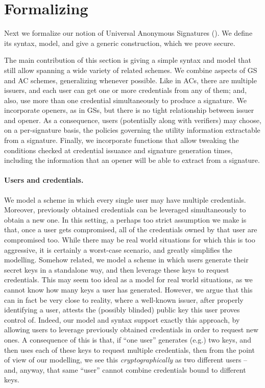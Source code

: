 \section{Formalizing \UAS}
\label{sec:formal-uas}


Next we formalize our notion of Universal Anonymous Signatures
(\UAS). We define its syntax, model, and give a generic construction, which
we prove secure. 

The main contribution of this section is giving a simple syntax and model that
still allow spanning a wide variety of related schemes. We combine aspects of GS
and AC schemes, generalizing whenever possible. Like in ACs, there are multiple
issuers, and each user can get one or more credentials from any of them; and,
also, use more than one credential simultaneously to produce a signature. We
incorporate openers, as in GSs, but there is no tight relationship between
issuer and opener. As a consequence, users (potentially along with verifiers)
may choose, on a per-signature basis, the policies governing the utility
information extractable from a signature. Finally, we incorporate functions that
allow tweaking the conditions checked at credential issuance and signature
generation times, including the information that an opener will be able to
extract from a signature.

\paragraph{Users and credentials.} %
We model a scheme in which every single user may have multiple credentials.
Moreover, previously obtained credentials can be leveraged simultaneously to
obtain a new one. In this setting, a perhaps too strict assumption we make is
that, once a user gets compromised, all of the credentials owned by that user
are compromised too. While there may be real world situations for which this is
too aggressive, it is certainly a worst-case scenario, and greatly simplifies
the modelling.
%
Somehow related, we model a scheme in which users generate their secret keys in
a standalone way, and then leverage these keys to request credentials. This may
seem too ideal as a model for real world situations, as we cannot know how
many keys a user has generated. However, we argue that this can in fact be very
close to reality, where a well-known issuer, after properly identifying a user,
attests the (possibly blinded) public key this user proves control of. Indeed,
our model and syntax support exactly this approach, by allowing users to
leverage previously obtained credentials in order to request new ones.
A consequence of this is that, if ``one user'' generates (e.g.) two keys, and
then uses each of these keys to request multiple credentials, then from the
point of view of our modelling, we see this \emph{cryptographically} as two
different users -- and, anyway, that same ``user'' cannot combine credentials
bound to different keys.

